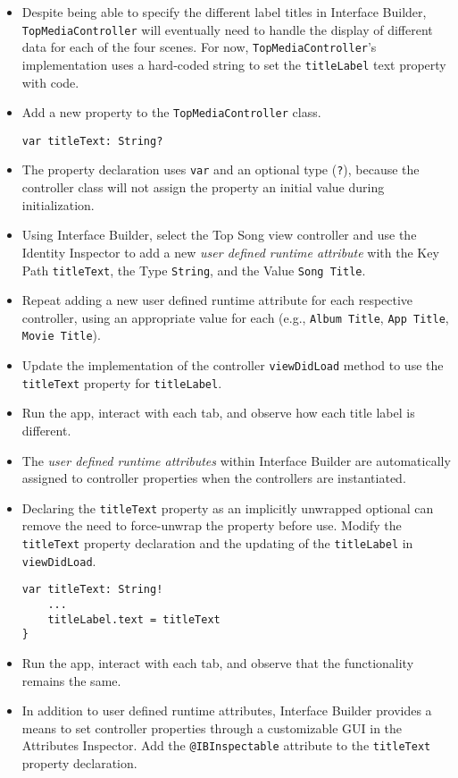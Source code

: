 \documentclass[a4paper,11pt]{scrartcl}
\begin{document}
\begin{itemize}
\item Despite being able to specify the different label titles in Interface Builder, \texttt{TopMediaController} will eventually need to handle the display of different data for each of the four scenes. For now, \texttt{TopMediaController}'s implementation uses a hard-coded string to set the \texttt{titleLabel} text property with code.
\item Add a new property to the \texttt{TopMediaController} class.
\begin{lstlisting}
var titleText: String?
\end{lstlisting}
\item The property declaration uses \texttt{var} and an optional type (\texttt{?}), because the controller class will not assign the property an initial value during initialization.
\item Using Interface Builder, select the Top Song view controller and use the Identity Inspector to add a new \textit{user defined runtime attribute} with the Key Path \texttt{titleText}, the Type \texttt{String}, and the Value \texttt{Song Title}.
\item Repeat adding a new user defined runtime attribute for each respective controller, using an appropriate value for each (e.g., \texttt{Album Title}, \texttt{App Title}, \texttt{Movie Title}).
\item Update the implementation of the controller \texttt{viewDidLoad} method to use the \texttt{titleText} property for \texttt{titleLabel}.
\item Run the app, interact with each tab, and observe how each title label is different.
\item The \textit{user defined runtime attributes} within Interface Builder are automatically assigned to controller properties when the controllers are instantiated.
\item Declaring the \texttt{titleText} property as an implicitly unwrapped optional can remove the need to force-unwrap the property before use. Modify the \texttt{titleText} property declaration and the updating of the \texttt{titleLabel} in \texttt{viewDidLoad}.
\begin{lstlisting}
var titleText: String!
	...
	titleLabel.text = titleText
}
\end{lstlisting}
\item Run the app, interact with each tab, and observe that the functionality remains the same.
\item In addition to user defined runtime attributes, Interface Builder provides a means to set controller properties through a customizable GUI in the Attributes Inspector. Add the \texttt{@IBInspectable} attribute to the \texttt{titleText} property declaration.

\end{itemize}
\end{document}
